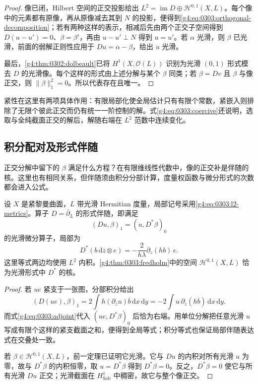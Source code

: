 \begin{proof}
	像已闭，Hilbert 空间的正交投影给出 \(L^2=\operatorname{im}D\oplus\mathscr H^{0,1}(X,L)\)。每个像中的元素都有原像，再从原像减去其到 \(N\) 的投影，便得到\eqref{g4:eq:0303:orthogonal-decomposition}；若有两种这样的表示，相减后先由两个正交子空间得到 \(D(u-u')=0\)、\(\beta=\beta'\)，再由 \(u-u'\perp N\) 得到 \(u=u'\)。若 \(\alpha\) 光滑，则 \(\beta\) 已光滑，前面的弱解正则性应用于 \(Du=\alpha-\beta\)，给出 \(u\) 光滑。

	最后，\cref{g4:thm:0302:dolbeault}已将 \(H^1(X,\mathcal O(L))\) 识别为光滑 \((0,1)\) 形式模去 \(D\) 的光滑像。每个这样的形式由上述分解与某个 \(\beta\) 同类；若 \(\beta=Dv\) 且 \(\beta\) 与像正交，则 \(\|\beta\|_1^2=0\)。所以代表存在且唯一。
\end{proof}

紧性在这里有两项具体作用：有限局部化使全局估计只有有限个常数，紧嵌入则排除了无限个彼此正交而仍有统一一阶控制的解。式\eqref{g4:eq:0303:coercive}还说明，选取与全纯截面正交的解后，解随右端在 \(L^2\) 范数中连续变化。

\subsection{积分配对及形式伴随}
\label{g4:subsec:0303:03}
正交分解中留下的 \(\beta\) 满足什么方程？在有限维线性代数中，像的正交补是伴随的核。这里也有相同关系，但伴随须由积分分部计算，度量权函数与微分形式的次数都会进入公式。

\begin{proposition}
	\label{g4:prop:0303:formal-adjoint}
	设 \(X\) 是紧黎曼曲面，\(L\) 带光滑 Hermitian 度量，局部记号采用\eqref{g4:eq:0303:l2-metrics}。算子 \(D=\bar\partial_L\) 的形式伴随，即满足
	\[
		(Du,\beta)_1=(u,D^*\beta)_0
	\]
	的光滑微分算子，局部为
	\begin{equation}
		\label{g4:eq:0303:adjoint}
		D^*(b\,\mathrm{d}\overline z\otimes e)
		=-\frac{2}{h\lambda}\partial_z(hb)\,e.
	\end{equation}
	这里等式两边均使用 \(L^2\) 内积。\cref{g4:thm:0303:fredholm}中的空间 \(\mathscr H^{0,1}(X,L)\) 恰为光滑形式中 \(D^*\) 的核。
\end{proposition}
\begin{proof}
	若 \(u e\) 紧支于一张图，分部积分给出
	\[
		(D(u e),\beta)_1
		=2\int h(\partial_{\overline z}u)\overline b\,\mathrm{d}x\,\mathrm{d}y
		=-2\int u\,\partial_{\overline z}(h\overline b)\,
		\mathrm{d}x\,\mathrm{d}y.
	\]
	而式\eqref{g4:eq:0303:adjoint}代入 \((u e,D^*\beta)_0\) 后恰为右端。用单位分解把任意光滑 \(u\) 写成有限个这样的紧支截面之和，便得到全局等式；积分等式也保证局部伴随表达式在交叠处一致。

	若 \(\beta\in\mathscr H^{0,1}(X,L)\)，前一定理已证明它光滑。它与 \(Du\) 的内积对所有光滑 \(u\) 为零，故与 \(D^*\beta\) 的内积恒零，取 \(u=D^*\beta\) 得到 \(D^*\beta=0\)。反之，\(D^*\beta=0\) 使它与所有光滑 \(Du\) 正交；光滑截面在 \(H^1_{\mathrm{Sob}}\) 中稠密，故它与整个像正交。
\end{proof}

